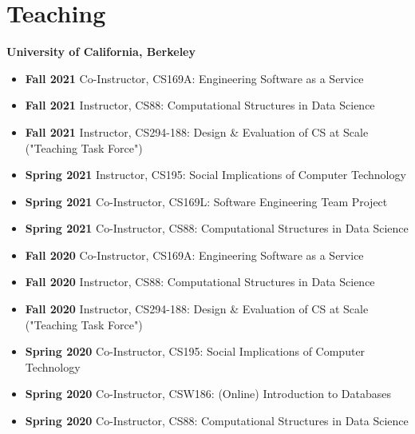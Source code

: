 \section{Teaching}

\vspace{6pt}

\textbf{University of California, Berkeley}

\vspace{5pt}

\begin{itemize}

  \setlength\itemsep{1em}
    \item \textbf{Fall 2021} Co-Instructor, CS169A: Engineering Software as a Service

    \item \textbf{Fall 2021} Instructor, CS88: Computational Structures in Data Science
    
    \item \textbf{Fall 2021} Instructor, CS294-188: Design \& Evaluation of CS at Scale ("Teaching Task Force")

    \item \textbf{Spring 2021} Instructor, CS195: Social Implications of Computer Technology
        
    \item \textbf{Spring 2021} Co-Instructor, CS169L: Software Engineering Team Project
    
    \item \textbf{Spring 2021} Co-Instructor, CS88: Computational Structures in Data Science
    
    \item \textbf{Fall 2020} Co-Instructor, CS169A: Engineering Software as a Service

    \item \textbf{Fall 2020} Instructor, CS88: Computational Structures in Data Science
    
    \item \textbf{Fall 2020} Instructor, CS294-188: Design \& Evaluation of CS at Scale ("Teaching Task Force")
    
    \item \textbf{Spring 2020} Co-Instructor, CS195: Social Implications of Computer Technology
      
    \item \textbf{Spring 2020} Co-Instructor, CSW186: (Online) Introduction to Databases
    
    \item \textbf{Spring 2020} Co-Instructor, CS88: Computational Structures in Data Science


\end{itemize}
